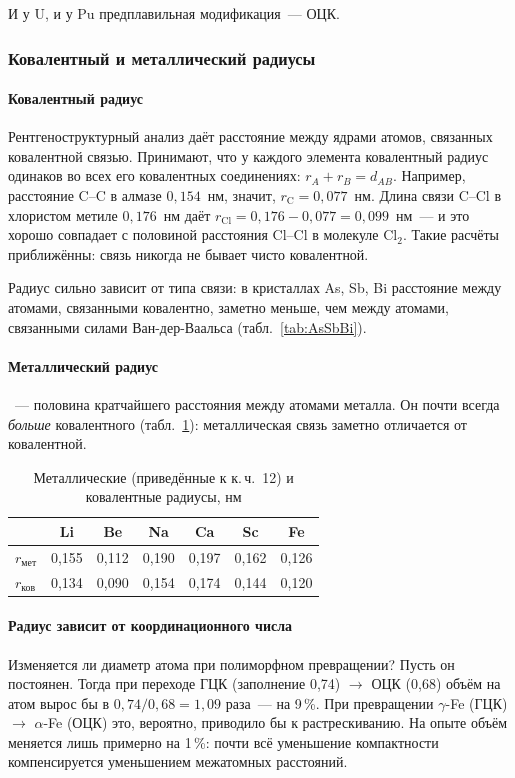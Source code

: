 И у U, и у Pu предплавильная модификация~— ОЦК.

\subsubsection{Ковалентный и металлический радиусы}

\paragraph{Ковалентный радиус}
Рентгеноструктурный анализ даёт расстояние между ядрами атомов,
связанных ковалентной связью. Принимают, что у каждого элемента
ковалентный радиус одинаков во всех его ковалентных соединениях:
$r_A+r_B=d_{AB}$. Например, расстояние C--C в алмазе $0{,}154$~нм, значит,
$r_\text{C}=0{,}077$~нм. Длина связи C--Cl в хлористом метиле
$0{,}176$~нм даёт $r_\text{Cl}=0{,}176-0{,}077=0{,}099$~нм~— и это хорошо
совпадает с половиной расстояния Cl--Cl в молекуле Cl$_2$. Такие расчёты
приближённы: связь никогда не бывает чисто ковалентной.

Радиус сильно зависит от типа связи: в кристаллах As, Sb, Bi расстояние
между атомами, связанными ковалентно, заметно меньше, чем между атомами,
связанными силами Ван-дер-Ваальса (табл.~\ref{tab:AsSbBi}).

\paragraph{Металлический радиус}
~— половина кратчайшего расстояния между атомами
металла. Он почти всегда \emph{больше} ковалентного (табл.~\ref{tab:radii}):
металлическая связь заметно отличается от ковалентной.

\begin{table}[ht]
\centering
\caption{Металлические (приведённые к к.\,ч.~12) и ковалентные радиусы, нм}
\label{tab:radii}
\small
\begin{tabular}{@{}lcccccc@{}}
\toprule
 & Li & Be & Na & Ca & Sc & Fe \\
\midrule
$r_\text{мет}$ & 0,155 & 0,112 & 0,190 & 0,197 & 0,162 & 0,126 \\
$r_\text{ков}$ & 0,134 & 0,090 & 0,154 & 0,174 & 0,144 & 0,120 \\
\bottomrule
\end{tabular}
\end{table}

\paragraph{Радиус зависит от координационного числа}
Изменяется ли диаметр атома при полиморфном превращении? Пусть он
постоянен. Тогда при переходе ГЦК (заполнение 0,74) $\to$ ОЦК (0,68) объём
на атом вырос бы в $0{,}74/0{,}68=1{,}09$ раза~— на 9\,\%. При превращении
$\gamma$-Fe (ГЦК) $\to$ $\alpha$-Fe (ОЦК) это, вероятно, приводило бы к
растрескиванию. На опыте объём меняется лишь примерно на 1\,\%: почти
всё уменьшение компактности компенсируется уменьшением межатомных
расстояний.


